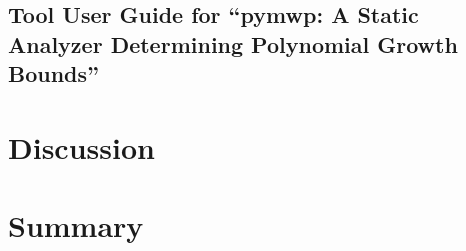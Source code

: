 \section{Tool User Guide for \enquote{pymwp: A Static Analyzer Determining Polynomial Growth Bounds}}\label{app:toolguide}


\chapter{Discussion}\label{ch:discussion}


\chapter{Summary}\label{ch:summary}


\backmatter
\printbibliography[label=chap:references, title=References]
\let\printbibliography\relax

\appendix

%

\clearpage\pagestyle{plain}
\printglossary[type=\acronymtype,nonumberlist,nopostdot,style=longragged]

\clearpage\printindex

\clearpage\pagestyle{plain}
\renewcommand{\glspostdescription}{,}
\printglossary[type=symbols,style=longragged]
